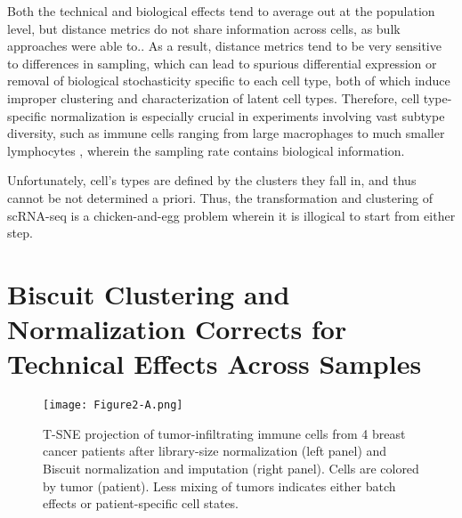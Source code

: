 Both the technical and biological effects tend to average out at the population level, but distance metrics do not share information across cells, as bulk approaches were able to..
As a result, distance metrics tend to be very sensitive to differences in sampling, which can lead to spurious differential expression or removal of biological stochasticity specific to each cell type, both of which induce improper clustering and characterization of latent cell types.
Therefore, cell type-specific normalization is especially crucial in experiments involving vast subtype diversity, such as immune cells ranging from large macrophages to much smaller lymphocytes \citep{Lun2016,Vallejos2017}, wherein the sampling rate contains biological information. 

Unfortunately, cell's types are defined by the clusters they fall in, and thus cannot be not determined a priori. 
Thus, the transformation and clustering of scRNA-seq is a chicken-and-egg problem wherein it is illogical to start from either step.

\section{Biscuit Clustering and Normalization Corrects for Technical Effects Across Samples}

\begin{figure}
\centering
\texttt{[image: Figure2-A.png]}
\caption{T-SNE projection of tumor-infiltrating immune cells from 4 breast cancer patients after library-size normalization (left panel) and Biscuit normalization and imputation (right panel). Cells are colored by tumor (patient). Less mixing of tumors indicates either batch effects or patient-specific cell states.
}
\label{fig:2a}
\end{figure}

